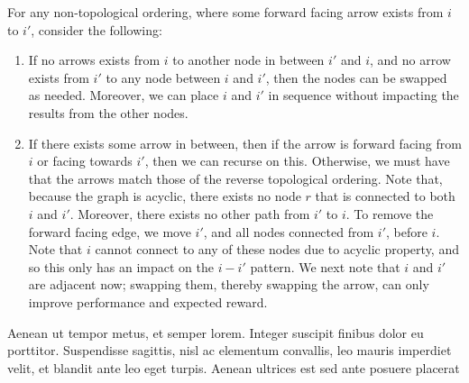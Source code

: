 \begin{prooof}
    For any non-topological ordering, where some forward facing arrow exists from $i$ to $i'$, consider the following: 
    \begin{enumerate}
        \item If no arrows exists from $i$ to another node in between $i'$ and $i$, and no arrow exists from $i'$ to any node between $i$ and $i'$, then the nodes can be swapped as needed. 
        Moreover, we can place $i$ and $i'$ in sequence without impacting the results from the other nodes. 
        \item If there exists some arrow in between, then if the arrow is forward facing from $i$ or facing towards $i'$, then we can recurse on this. Otherwise, we must have that the arrows match those of the reverse topological ordering. 
        Note that, because the graph is acyclic, there exists no node $r$ that is connected to both $i$ and $i'$. 
        Moreover, there exists no other path from $i'$ to $i$. 
        To remove the forward facing edge, we move $i'$, and all nodes connected from $i'$, before $i$. 
        Note that $i$ cannot connect to any of these nodes due to acyclic property, and so this only has an impact on the $i-i'$ pattern. 
        We next note that $i$ and $i'$ are adjacent now; swapping them, thereby swapping the arrow, can only improve performance and expected reward. 
    \end{enumerate}
\end{prooof}

 Aenean ut tempor metus, et semper lorem. Integer suscipit finibus dolor eu porttitor. Suspendisse sagittis, nisl ac elementum convallis, leo mauris imperdiet velit, et blandit ante leo eget turpis. Aenean ultrices est sed ante posuere placerat

